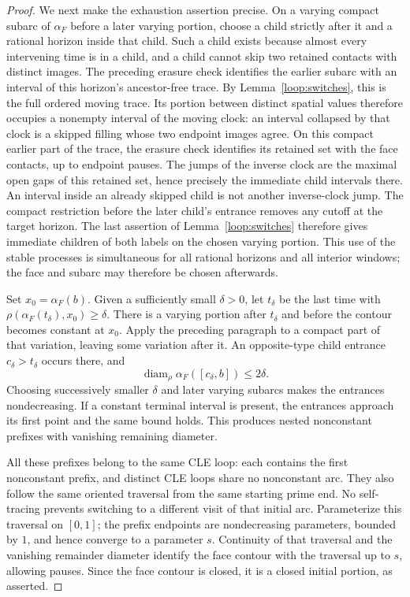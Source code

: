 \documentclass[11pt]{article}
\numberwithin{equation}{section}
\theoremstyle{definition}
\theoremstyle{remark}
\newcommand{\1}{\mathbf 1}
\begin{document}
\begin{proof}
We next make the exhaustion assertion precise.  On a varying compact
subarc of $\alpha_F$ before a later varying portion, choose a child
strictly after it and a rational horizon inside that child.  Such a
child exists because almost every intervening time is in a child,
and a child cannot skip two retained contacts with distinct images.
The preceding erasure check identifies the earlier subarc with an
interval of this horizon's ancestor-free trace.  By
Lemma~\ref{loop:switches}, this is the full ordered moving trace.
Its portion between distinct spatial values therefore occupies a
nonempty interval of the moving clock: an interval collapsed by that
clock is a skipped filling whose two endpoint images agree.
On this compact earlier part of the trace, the erasure check identifies
its retained set with the face contacts, up to endpoint pauses.  The
jumps of the inverse clock are the maximal open gaps of this retained
set, hence precisely the immediate child intervals there.  An interval
inside an already skipped child is not another inverse-clock jump.
The compact restriction before the later child's entrance removes any
cutoff at the target horizon.  The last assertion of
Lemma~\ref{loop:switches} therefore gives immediate children of both
labels on the chosen varying portion.  This use of the stable processes is simultaneous
for all rational horizons and all interior windows; the face and
subarc may therefore be chosen afterwards.

Set $x_0=\alpha_F(b)$.  Given a sufficiently small $\delta>0$, let
$t_\delta$ be the last time with
$\rho(\alpha_F(t_\delta),x_0)\ge\delta$.  There is a varying portion
after $t_\delta$ and before the contour becomes constant at $x_0$.
Apply the preceding paragraph to a compact part of that variation,
leaving some variation after it.  An opposite-type child entrance
$c_\delta>t_\delta$ occurs there, and
\[
 \operatorname{diam}_\rho\alpha_F([c_\delta,b])\le2\delta.
\]
Choosing successively smaller $\delta$ and later varying subarcs
makes the entrances nondecreasing.  If a constant terminal interval
is present, the entrances approach its first point and the same bound
holds.  This produces nested nonconstant prefixes with vanishing
remaining diameter.

All these prefixes belong to the same CLE loop: each contains the
first nonconstant prefix, and distinct CLE loops share no nonconstant
arc.  They also follow the same oriented traversal from the same
starting prime end.  No self-tracing prevents switching to a different
visit of that initial arc.  Parameterize this traversal on $[0,1]$;
the prefix endpoints are nondecreasing parameters, bounded by $1$,
and hence converge to a parameter $s$.  Continuity of that traversal
and the vanishing remainder diameter identify the face contour with
the traversal up to $s$, allowing pauses.  Since the face contour is
closed, it is a closed initial portion, as asserted.
\end{proof}
\end{document}
